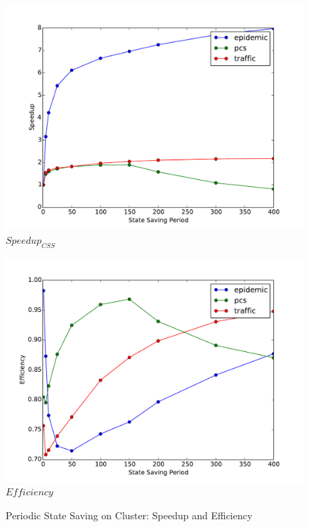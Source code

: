 \documentclass[11pt]{book}
\begin{document}
\begin{figure}
  \begin{minipage}{.5\textwidth}
    \begin{center}
      \includegraphics[width=\textwidth,keepaspectratio,quiet]{figs/state_saving/beowulf/speedup.pdf} \\
      $Speedup_{CSS}$ \\
    \end{center}
  \end{minipage}%
  \hfill
  \begin{minipage}{.5\textwidth}
    \begin{center}
      \includegraphics[width=\textwidth,keepaspectratio,quiet]{figs/state_saving/beowulf/efficiency.pdf} \\
      $Efficiency$ \\
    \end{center}
  \end{minipage}
  \caption{Periodic State Saving on Cluster: Speedup and Efficiency}\label{ssp_analysis_cluster}
\end{figure}
\end{document}
